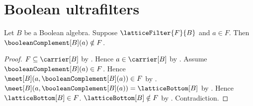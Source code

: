 \section{Boolean ultrafilters}




\begin{proposition}\label{boolean_lattice_filter_excludes_complement}
    Let $B$ be a Boolean algebra.
    Suppose $\latticeFilter{F}{B}$ and $a\in F$.
    Then $\booleanComplement[B](a)\notin F$.
\end{proposition}
\begin{proof}
    $F\subseteq\carrier[B]$ by
        .
    Hence $a\in\carrier[B]$ by .
    Assume $\booleanComplement[B](a)\in F$.
    Hence $\meet[B](a,\booleanComplement[B](a))\in F$ by
        .
    $\meet[B](a,\booleanComplement[B](a))
        =\latticeBottom[B]$ by .
    Hence $\latticeBottom[B]\in F$.
    $\latticeBottom[B]\notin F$ by
        .
    Contradiction.
\end{proof}

